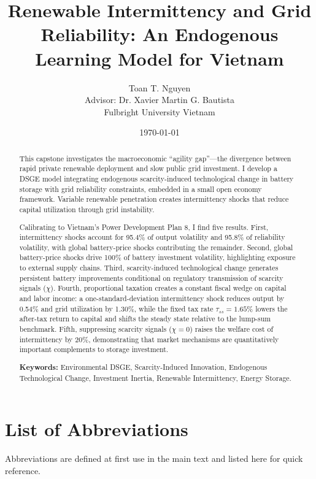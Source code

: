 \documentclass[12pt, a4paper]{article}
\title{Renewable Intermittency and Grid Reliability: An Endogenous Learning Model for Vietnam}
\author{Toan T. Nguyen \\ \small{Advisor: Dr. Xavier Martin G. Bautista} \\ \small{Fulbright University Vietnam}}
\date{\today}
\begin{document}
\maketitle

\tableofcontents
\clearpage

\begin{abstract}
This capstone investigates the macroeconomic ``agility gap''---the divergence between rapid private renewable deployment and slow public grid investment. I develop a DSGE model integrating endogenous scarcity-induced technological change in battery storage with grid reliability constraints, embedded in a small open economy framework. Variable renewable penetration creates intermittency shocks that reduce capital utilization through grid instability.

Calibrating to Vietnam's Power Development Plan 8, I find five results. First, intermittency shocks account for 95.4\% of output volatility and 95.8\% of reliability volatility, with global battery-price shocks contributing the remainder. Second, global battery-price shocks drive 100\% of battery investment volatility, highlighting exposure to external supply chains. Third, scarcity-induced technological change generates persistent battery improvements conditional on regulatory transmission of scarcity signals ($\chi$). Fourth, proportional taxation creates a constant fiscal wedge on capital and labor income: a one-standard-deviation intermittency shock reduces output by 0.54\% and grid utilization by 1.30\%, while the fixed tax rate $\tau_{ss}=1.65\%$ lowers the after-tax return to capital and shifts the steady state relative to the lump-sum benchmark. Fifth, suppressing scarcity signals ($\chi = 0$) raises the welfare cost of intermittency by 20\%, demonstrating that market mechanisms are quantitatively important complements to storage investment.

\vspace{0.5cm}
\noindent \textbf{Keywords:} Environmental DSGE, Scarcity-Induced Innovation, Endogenous Technological Change, Investment Inertia, Renewable Intermittency, Energy Storage.
\end{abstract}
\clearpage

\section*{List of Abbreviations}
\noindent Abbreviations are defined at first use in the main text and listed here for quick reference.
\end{document}
